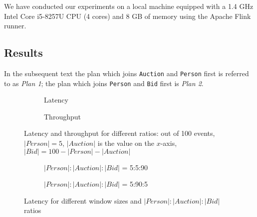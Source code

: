 We have conducted our experiments on a local machine equipped with a 1.4 GHz Intel Core i5-8257U CPU (4 cores) and 8 GB of memory using the Apache Flink runner. 

\subsection{Results}

In the subsequent text the plan which joins \texttt{Auction} and \texttt{Person} first is referred to as \textit{Plan 1}; the plan which joins \texttt{Person} and \texttt{Bid} first is \textit{Plan 2}.

\begin{figure}[!ht]
    \begin{subfigure}[b]{0.45\textwidth}
            
            \captionsetup{justification=justified}
            \caption{Latency}
            \label{fig:latency_ratio}
    \end{subfigure}
    \hspace{5mm}
    \begin{subfigure}[b]{0.45\textwidth}
            
            \captionsetup{justification=justified}
            \caption{Throughput}
            \label{fig:throughput_ratio}
    \end{subfigure}
    \caption{Latency and throughput for different ratios: out of 100 events, $|Person| = 5$, $|Auction|$ is the value on the $x$-axis, $|Bid| = 100 - |Person| - |Auction|$}
    \label{fig:ratio_plots}
\end{figure}

\begin{figure}[!ht]
    \centering
    \begin{subfigure}[b]{0.45\textwidth}
            
            \captionsetup{justification=justified}
            \caption{$|Person|:|Auction|:|Bid|$ = 5:5:90}
            \label{fig:latency_window_5590}
    \end{subfigure}
    \hspace{1.25mm}
    \begin{subfigure}[b]{0.45\textwidth}
            
            \captionsetup{justification=justified}
            \caption{$|Person|:|Auction|:|Bid|$ = 5:90:5}
            \label{fig:latency_window_5905}
    \end{subfigure}
    \caption{Latency for different window sizes and $|Person|:|Auction|:|Bid|$ ratios}
    \label{fig:latency_plots}
\end{figure}

